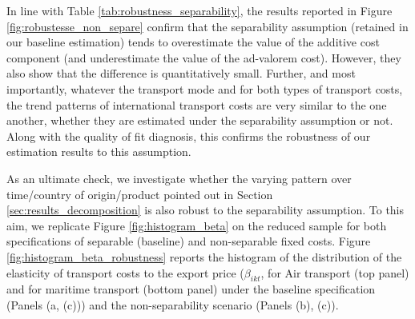 \documentclass[a4paper,11pt]{article}
\begin{document}
In line with Table \ref{tab:robustness_separability}, the results reported in Figure \ref{fig:robustesse_non_separe} confirm that the separability assumption (retained in our baseline estimation) tends to overestimate the value of the additive cost component (and underestimate the value of the ad-valorem cost).
However, they also show that the difference is quantitatively small. Further, and most importantly, whatever the transport mode and for both types of transport costs, the trend patterns of international transport costs are very similar to the one another, whether they are estimated under the separability assumption or not.
Along with the quality of fit diagnosis, this confirms the robustness of our estimation results to this assumption.

As an ultimate check, we investigate whether the varying pattern over time/country of origin/product pointed out in Section \ref{sec:results_decomposition} is also robust to the separability assumption.
To this aim, we replicate Figure \ref{fig:histogram_beta} on the reduced sample for both specifications of separable (baseline) and non-separable fixed costs.
Figure \ref{fig:histogram_beta_robustness} reports the histogram of the distribution of the elasticity of transport costs to the export price ($\beta_{ikt}$, for Air transport (top panel) and for maritime transport (bottom panel) under the baseline specification (Panels (a, (c))) and the non-separability scenario (Panels (b), (c)).
\end{document}
